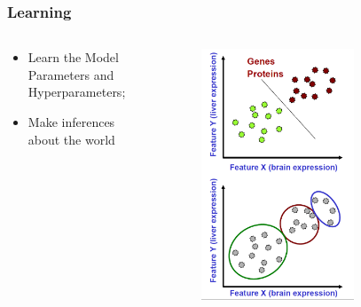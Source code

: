 \documentclass{ctexbeamer}
\begin{document}
\begin{frame}
  \frametitle{Learning}
  \begin{columns}[T]
    \begin{column}{0.5\textwidth}
      \begin{itemize}
        \item Learn the Model Parameters and Hyperparameters; \\
        \item Make inferences about the world \\
      \end{itemize}
    \end{column}
    \begin{column}{0.5\textwidth}
      \begin{figure}[H]
        \raggedleft
        \includegraphics[width=0.7\textwidth]{./figures/learning.png}
        \label{fig:learning}
      \end{figure}
    \end{column}
  \end{columns}
\end{frame}
\end{document}
